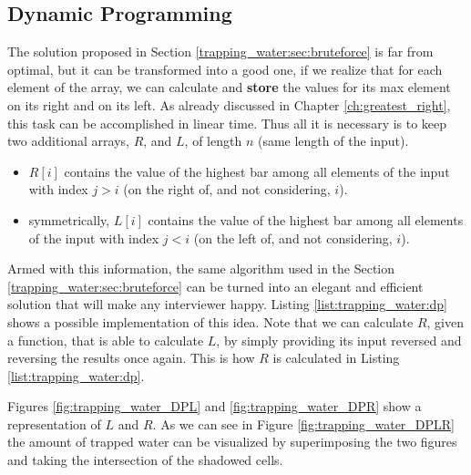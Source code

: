 \subsection{Dynamic Programming}
\label{trapping_water:sec:dp}
The solution proposed in Section \ref{trapping_water:sec:bruteforce} is far from optimal, but it can be transformed into a good one, if we realize that
for each element of the array, we can calculate and \textbf{store} the values for its max element on its right and on its left. As already discussed in Chapter \ref{ch:greatest_right}, this task can be accomplished in linear time. Thus all it is necessary is to keep two additional arrays, $R$, and $L$, of  length $n$ (same length of the input). 

\begin{itemize}
	\item $R[i]$ contains the value of the highest bar among all elements of the input with index $j > i$ (on the right of, and not considering, $i$).
	\item symmetrically, $L[i]$ contains the value of the highest bar among all elements of the input with index $j < i$ (on the left of, and not considering, $i$).
\end{itemize}

Armed with this information, the same algorithm used in the Section \ref{trapping_water:sec:bruteforce} can be turned into an elegant and efficient solution that will make any interviewer happy. Listing \ref{list:trapping_water:dp} shows a possible implementation of this idea. Note that we can calculate $R$, given a function,  that is able to calculate $L$, by simply providing its input reversed and reversing the results once again. This is how $R$ is calculated in Listing \ref{list:trapping_water:dp}.

Figures \ref{fig:trapping_water_DPL} and \ref{fig:trapping_water_DPR} show a representation of $L$ and $R$. As we can see in Figure \ref{fig:trapping_water_DPLR} the amount of trapped water can be visualized by superimposing the two figures and taking the intersection of the shadowed cells.


